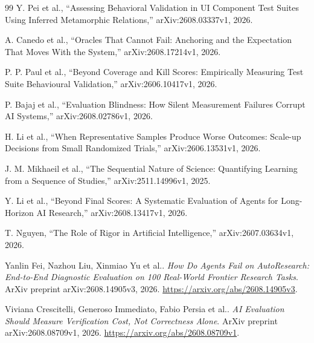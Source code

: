 \documentclass[11pt,a4paper]{article}
\begin{document}
\begin{thebibliography}{99}
Y. Pei et al., ``Assessing Behavioral Validation in UI Component Test Suites Using Inferred Metamorphic Relations,'' arXiv:2608.03337v1, 2026.

A. Canedo et al., ``Oracles That Cannot Fail: Anchoring and the Expectation That Moves With the System,'' arXiv:2608.17214v1, 2026.

P. P. Paul et al., ``Beyond Coverage and Kill Scores: Empirically Measuring Test Suite Behavioural Validation,'' arXiv:2606.10417v1, 2026.

P. Bajaj et al., ``Evaluation Blindness: How Silent Measurement Failures Corrupt AI Systems,'' arXiv:2608.02786v1, 2026.

H. Li et al., ``When Representative Samples Produce Worse Outcomes: Scale-up Decisions from Small Randomized Trials,'' arXiv:2606.13531v1, 2026.

J. M. Mikhaeil et al., ``The Sequential Nature of Science: Quantifying Learning from a Sequence of Studies,'' arXiv:2511.14996v1, 2025.

Y. Li et al., ``Beyond Final Scores: A Systematic Evaluation of Agents for Long-Horizon AI Research,'' arXiv:2608.13417v1, 2026.

T. Nguyen, ``The Role of Rigor in Artificial Intelligence,'' arXiv:2607.03634v1, 2026.

Yanlin Fei, Nazhou Liu, Xinmiao Yu et al..
\emph{How Do Agents Fail on AutoResearch: End-to-End Diagnostic Evaluation on 100 Real-World Frontier Research Tasks}.
ArXiv preprint arXiv:2608.14905v3, 2026.
\url{https://arxiv.org/abs/2608.14905v3}.

Viviana Crescitelli, Generoso Immediato, Fabio Persia et al..
\emph{AI Evaluation Should Measure Verification Cost, Not Correctness Alone}.
ArXiv preprint arXiv:2608.08709v1, 2026.
\url{https://arxiv.org/abs/2608.08709v1}.
\end{thebibliography}
\end{document}
